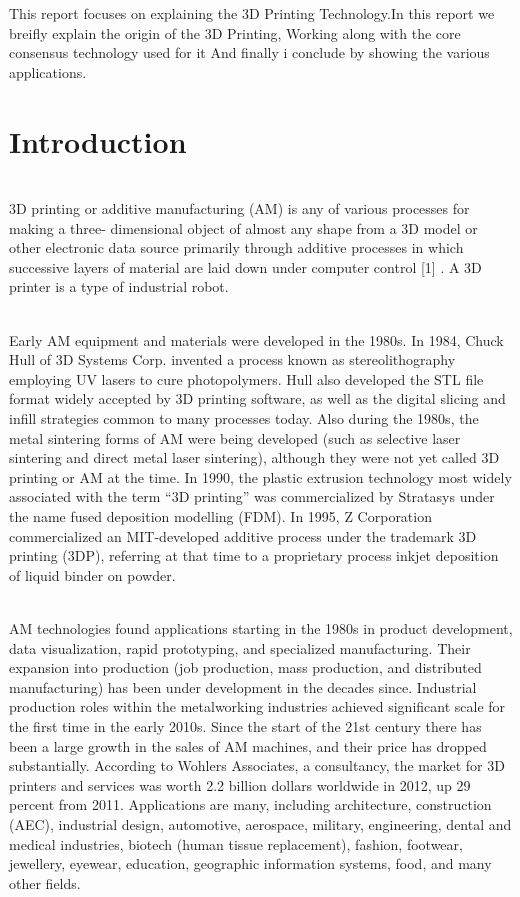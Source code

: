 \documentclass[12pt,a4paper]{report}
\begin{document}
This report focuses on explaining the 3D Printing Technology.In this report we breifly explain the origin of the 3D Printing, Working along with the core consensus technology used for it And finally i conclude by showing the various applications.

\newpage
\listoffigures
{}
\tableofcontents{}

\clearpage
{}

		\chapter{Introduction}
	\setlength{\parindent}{10ex} 
	\indent 
	\\3D printing or additive manufacturing (AM) is any of various processes for making a three-
	dimensional object of almost any shape from a 3D model or other electronic data source primarily
	through additive processes in which successive layers of material are laid down under computer
	control [1] . A 3D printer is a type of industrial robot.\par
	\indent	
	\\Early AM equipment and materials were developed in the 1980s. In 1984, Chuck Hull of 3D
	Systems Corp. invented a process known as stereolithography employing UV lasers to cure
	photopolymers. Hull also developed the STL file format widely accepted by 3D printing software,
	as well as the digital slicing and infill strategies common to many processes today. Also during the
	1980s, the metal sintering forms of AM were being developed (such as selective laser sintering and
	direct metal laser sintering), although they were not yet called 3D printing or AM at the time. In
	1990, the plastic extrusion technology most widely associated with the term “3D printing” was
	commercialized by Stratasys under the name fused deposition modelling (FDM). In 1995, Z
	Corporation commercialized an MIT-developed additive process under the trademark 3D printing
	(3DP), referring at that time to a proprietary process inkjet deposition of liquid binder on powder.\par
	\indent
	\\AM technologies found applications starting in the 1980s in product development, data
	visualization, rapid prototyping, and specialized manufacturing. Their expansion into production
	(job production, mass production, and distributed manufacturing) has been under development in
	the decades since. Industrial production roles within the metalworking industries achieved
	significant scale for the first time in the early 2010s. Since the start of the 21st century there has
	been a large growth in the sales of AM machines, and their price has dropped substantially.
	According to Wohlers Associates, a consultancy, the market for 3D printers and services was worth
	2.2 billion dollars worldwide in 2012, up 29 percent from 2011. Applications are many, including architecture,
	construction (AEC), industrial design, automotive, aerospace, military, engineering, dental and
	medical industries, biotech (human tissue replacement), fashion, footwear, jewellery, eyewear,
	education, geographic information systems, food, and many other fields.\par
\end{document}
